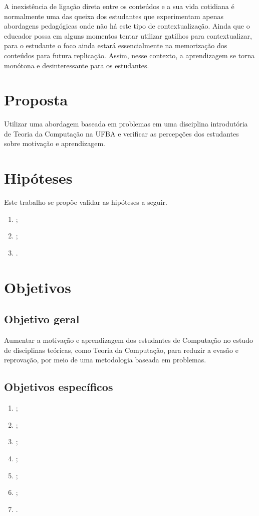 A inexistência de ligação direta entre os conteúdos
e a sua vida cotidiana é normalmente uma das queixa dos estudantes
que experimentam apenas abordagens pedagógicas onde não
há este tipo de contextualização.
Ainda que o educador possa em alguns momentos tentar
utilizar gatilhos para contextualizar, para o
estudante o foco ainda estará essencialmente
na memorização dos conteúdos para futura
replicação.
Assim, nesse contexto, a aprendizagem se torna monótona
e desinteressante para os estudantes.


\section{Proposta}
\label{sec-proposta}
Utilizar uma abordagem baseada em problemas em uma disciplina
introdutória de Teoria da Computação na \ac{UFBA} e
verificar as percepções dos estudantes sobre
motivação e aprendizagem.

\section{Hipóteses}
\label{sec-hipoteses}
Este trabalho se propõe validar as hipóteses a seguir.

\begin{enumerate}
\item{\label{h1ref} \hatexto;}
\item{\label{h2ref} \hbtexto;}
\item{\label{h3ref} \hctexto.}
\end{enumerate}

\section{Objetivos}
\label{sec-objetivos}

\subsection{Objetivo geral}
Aumentar a motivação e aprendizagem dos estudantes de Computação no estudo
de disciplinas teóricas, como Teoria da Computação, para reduzir a evasão e reprovação,
por meio de uma metodologia baseada em problemas.

\subsection{Objetivos específicos}
\begin{enumerate}
\item{\label{oe1ref} \oeatexto;}
\item{\label{oe2ref} \oebtexto;}
\item{\label{oe3ref} \oectexto;}
\item{\label{oe4ref} \oedtexto;}
\item{\label{oe5ref} \oeetexto;}
\item{\label{oe6ref} \oeftexto;}
\item{\label{oe7ref} \oegtexto.}
\end{enumerate}

